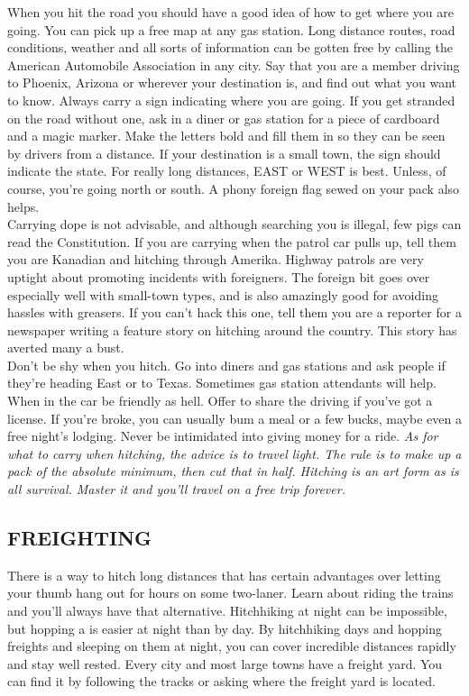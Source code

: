 \documentclass[11pt,twoside,a4paper]{book}
\begin{document}
When you hit the road you should have a good idea of how to get where you are going. You can pick up a free map at any gas station. Long distance routes, road conditions, weather and all sorts of information can be gotten free by calling the American Automobile Association in any city. Say that you are a member driving to Phoenix, Arizona or wherever your destination is, and find out what you want to know. Always carry a sign indicating where you are going. If you get stranded on the road without one, ask in a diner or gas station for a piece of cardboard and a magic marker. Make the letters bold and fill them in so they can be seen by drivers from a distance. If your destination is a small town, the sign should indicate the state. For really long distances, EAST or WEST is best. Unless, of course, you're going north or south. A phony foreign flag sewed on your pack also helps.~\\

Carrying dope is not advisable, and although searching you is illegal, few pigs can read the Constitution. If you are carrying when the patrol car pulls up, tell them you are Kanadian and hitching through Amerika. Highway patrols are very uptight about promoting incidents with foreigners. The foreign bit goes over especially well with small-town types, and is also amazingly good for avoiding hassles with greasers. If you can't hack this one, tell them you are a reporter for a newspaper writing a feature story on hitching around the country. This story has averted many a bust.~\\

Don't be shy when you hitch. Go into diners and gas stations and ask people if they're heading East or to Texas. Sometimes gas station attendants will help. When in the car be friendly as hell. Offer to share the driving if you've got a license. If you're broke, you can usually bum a meal or a few bucks, maybe even a free night's lodging. Never be intimidated into giving money for a ride. \emph{As for what to carry when hitching, the advice is to travel light. The rule is to make up a pack of the absolute minimum, then cut that in half. Hitching is an art form as is all survival. Master it and you'll travel on a free trip forever. }

\subsection{FREIGHTING}

There is a way to hitch long distances that has certain advantages over letting your thumb hang out for hours on some two-laner. Learn about riding the trains and you'll always have that alternative. Hitchhiking at night can be impossible, but hopping a is easier at night than by day. By hitchhiking days and hopping freights and sleeping on them at night, you can cover incredible distances rapidly and stay well rested. Every city and most large towns have a freight yard. You can find it by following the tracks or asking where the freight yard is located.~\\
\end{document}
